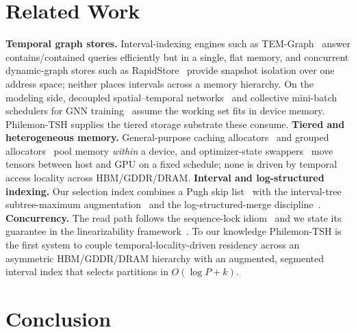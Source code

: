 \documentclass[10pt]{article}
\theoremstyle{definition}
\begin{document}
\section{Related Work}
\label{sec:related}

\textbf{Temporal graph stores.} Interval-indexing engines such as
TEM-Graph~\citep{temgraph} answer contains/contained queries efficiently but in a
single, flat memory, and concurrent dynamic-graph stores such as
RapidStore~\citep{rapidstore} provide snapshot isolation over one address space;
neither places intervals across a memory hierarchy. On the modeling side, decoupled
spatial--temporal networks~\citep{d2stgnn} and collective mini-batch schedulers for
GNN training~\citep{morphgl} assume the working set fits in device memory.
Philemon-TSH supplies the tiered storage substrate these consume.
\textbf{Tiered and heterogeneous memory.} General-purpose caching
allocators~\citep{paszke2019pytorch,nccl} and grouped
allocators~\citep{shoeybi2019megatron} pool memory \emph{within} a device, and
optimizer-state swappers~\citep{rasley2020deepspeed} move tensors between host and
GPU on a fixed schedule; none is driven by temporal access locality across
HBM/GDDR/DRAM. \textbf{Interval and log-structured indexing.} Our selection index
combines a Pugh skip list~\citep{pugh1990skiplists} with the interval-tree
subtree-maximum augmentation~\citep[\S14.3]{clrs2009} and the log-structured-merge
discipline~\citep{oneil1996lsm,leveldb}. \textbf{Concurrency.} The read path follows
the sequence-lock idiom~\citep{lamport1979seqcst} and we state its guarantee in the
linearizability framework~\citep{herlihy1990linearizability}. To our knowledge
Philemon-TSH is the first system to couple temporal-locality-driven residency across
an asymmetric HBM/GDDR/DRAM hierarchy with an augmented, segmented interval index
that selects partitions in $O(\log P + k)$.

\section{Conclusion}
\label{sec:conclusion}
\end{document}

